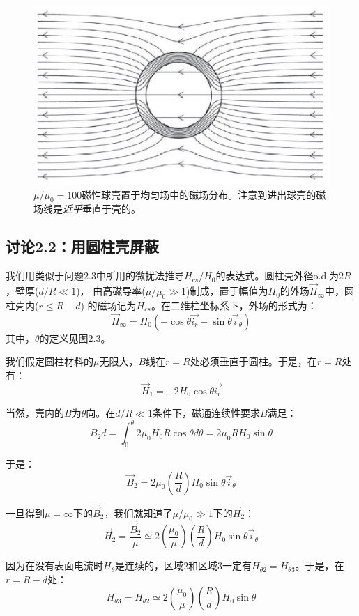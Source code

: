 \begin{figure}[htbp]
  \centering
 \includegraphics[scale=0.7]{chpt2/figs/fig2.6.eps}
  \caption{$\mu/\mu_0=100$磁性球壳置于均匀场中的磁场分布。注意到进出球壳的磁场线是\textit{近乎}垂直于壳的。}
\end{figure}


\subsection{讨论2.2：用圆柱壳屏蔽}
我们用类似于问题2.3中所用的微扰法推导$H_{cs}/H_0$的表达式。圆柱壳外径o.d.为$2R$，壁厚($d/R\ll 1$)，
由高磁导率($\mu/\mu_0 \gg 1$)制成，置于幅值为$H_0$的外场$\vec{H}_\infty$中，圆柱壳内($r\le R-d$)
的磁场记为$H_{cs}$。在二维柱坐标系下，外场的形式为：
\begin{equation*}
\vec{H}_\infty =H_0 (-\cos\theta \vec{i_r}+\sin\theta\vec{i}_\theta) \tag{2.40}
\end{equation*}
其中，$\theta$的定义见图2.3。

我们假定圆柱材料的$\mu$无限大，$B$线在$r=R$处必须垂直于圆柱。于是，在$r=R$处有：
$$\vec{H}_1 =-2 H_0 \cos\theta \vec{i_r}$$

当然，壳内的$B$为$\theta$向。在$d/R\ll 1$条件下，磁通连续性要求$B$满足：
$$B_2 d=\int_{0}^{\theta}2\mu_0 H_0 R\cos\theta d\theta=2\mu_0 R H_0 \sin\theta$$

于是：
$$\vec{B}_2=2\mu_0 \left(\frac{R}{d}\right)H_0 \sin\theta \vec{i}_\theta$$

一旦得到$\mu=\infty$下的$\vec{B}_2$，我们就知道了$\mu/\mu_0 \gg 1$下的$\vec{H}_2$：
$$\vec{H}_2= \frac{\vec{B}_2}{\mu}\simeq 2\left(\frac{\mu_0}{\mu}\right) \left(\frac{R}{d}\right)H_0 \sin\theta \vec{i}_\theta$$

因为在没有表面电流时$H_\theta$是连续的，区域2和区域3一定有$H_{\theta 2}=H_{\theta 3}$。于是，在$r=R-d$处：
$$H_{\theta 3}=H_{\theta 2}\simeq 2\left(\frac{\mu_0}{\mu}\right) \left(\frac{R}{d}\right)H_0 \sin\theta$$

